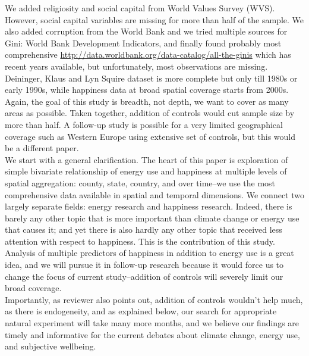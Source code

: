 We added religiosity and social capital from World Values Survey
(WVS). However, social capital variables are missing for more than half of the
sample. We also added corruption from the World
Bank and we tried multiple sources for Gini: World Bank Development Indicators, 
and finally found probably most comprehensive
\url{http://data.worldbank.org/data-catalog/all-the-ginis} which has recent
years available, but unfortunately, most observations are missing. Deininger,
Klaus and Lyn Squire dataset is more complete but only till 1980s or early
1990s, while happiness data at broad spatial coverage starts from 2000s.
Again, the goal of this study is breadth, not depth, we want to cover as many
areas as possible. Taken together, addition of controls would cut sample size by
more than half. %
 A follow-up study is possible for a very limited geographical coverage such as
 Western Europe using extensive set of controls, but this would be a different
 paper. 
\\

We start with a general clarification.
The heart of this paper is exploration of simple bivariate relationship of
energy use and happiness at multiple levels of spatial aggregation: county,
state, country, and over time--we use the most comprehensive data available in
spatial and temporal dimensions.
We connect two largely separate fields: energy
research and happiness research. Indeed, there is barely any other topic that is
more important than climate change or energy use that causes it; and yet there is
also hardly any other topic that received less attention with respect to
happiness. This is the contribution of this study.
\\

Analysis of multiple predictors of happiness in addition to energy use is a
great idea, and we will pursue it in follow-up research because it would
 force us to change the focus of current study--addition of controls will
 severely limit our broad coverage.
\\

Importantly, as reviewer also points out, addition of controls
wouldn't help much, as there is endogeneity, and as explained below, our search
for appropriate natural experiment will take many more months, and we believe
our findings are timely and informative for the current debates about climate
change, energy use, and subjective wellbeing.



